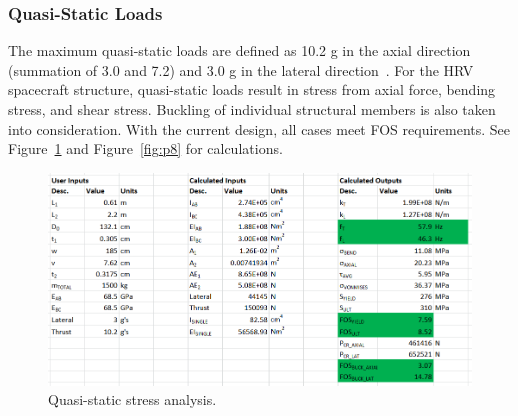 \documentclass[paper=letter, fontsize=11pt]{scrartcl} %
\numberwithin{equation}{section} %
\numberwithin{figure}{section} %
\numberwithin{table}{section} %
\begin{document}
\subsubsection{Quasi-Static Loads}

The maximum quasi-static loads are defined as 10.2 g in the axial direction (summation of 3.0 and 7.2) and 3.0 g in the lateral direction~\cite{delta2}. For the HRV spacecraft structure, quasi-static loads result in stress from axial force, bending stress, and shear stress. Buckling of individual structural members is also taken into consideration. With the current design, all cases meet FOS requirements. See Figure~\ref{fig:p7} and Figure~\ref{fig:p8} for calculations.

\begin{figure}[H]
    \begin{center}
    \includegraphics[width=1\textwidth]{Pics/7.png}
    \caption{Quasi-static stress analysis.}
    \label{fig:p7}
    \end{center}
\end{figure}
\end{document}
